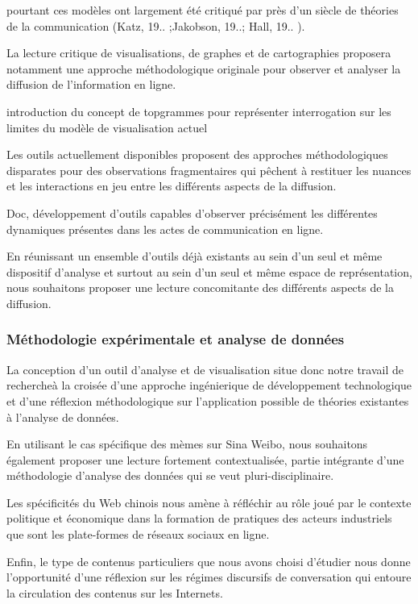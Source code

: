 pourtant ces modèles ont largement été critiqué par près d{\textquoteright}un siècle de théories de la communication (Katz, 19.. ;Jakobson, 19..; Hall, 19.. ).

La lecture critique de visualisations, de graphes et de cartographies proposera notamment une approche méthodologique originale pour observer et analyser la diffusion de l{\textquoteright}information en ligne.

introduction du concept de topgrammes pour représenter
interrogation sur les limites du modèle de visualisation actuel

Les outils actuellement disponibles proposent des approches méthodologiques disparates pour des observations fragmentaires qui pêchent à restituer les nuances et les interactions en jeu entre les différents aspects de la diffusion.

Doc, développement d'outils capables d'observer précisément les différentes dynamiques présentes dans les actes de communication en ligne.

En réunissant un ensemble d'outils déjà existants au sein d'un seul et même dispositif d'analyse et surtout au sein d'un seul et même espace de représentation, nous souhaitons proposer une lecture concomitante des différents aspects de la diffusion.


\subsubsection{Méthodologie expérimentale et analyse de données}

La conception d{\textquoteright}un outil d{\textquoteright}analyse et de visualisation situe donc notre travail de rechercheà la croisée d'une approche ingénierique de développement technologique et d'une réflexion méthodologique sur l'application possible de théories existantes à l'analyse de données.

En utilisant le cas spécifique des mèmes sur Sina Weibo, nous souhaitons également proposer une lecture fortement contextualisée, partie intégrante d'une méthodologie d'analyse des données qui se veut pluri-disciplinaire.

Les spécificités du Web chinois nous amène à réfléchir au rôle joué par le contexte politique et économique dans la formation de pratiques des acteurs industriels que sont les plate-formes de réseaux sociaux en ligne.

Enfin, le type de contenus particuliers que nous avons choisi d'étudier nous donne l'opportunité d'une réflexion sur les régimes discursifs de conversation qui entoure la circulation des contenus sur les Internets.

